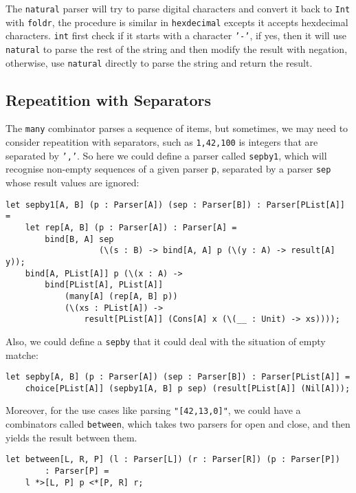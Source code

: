 The \texttt{natural} parser will try to parse digital characters and convert it back to \texttt{Int} with \texttt{foldr}, the procedure is similar in \texttt{hexdecimal} excepts it accepts hexdecimal characters. \texttt{int} first check if it starts with a character \texttt{'-'}, if yes, then it will use \texttt{natural} to parse the rest of the string and then modify the result with negation, otherwise, use \texttt{natural} directly to parse the string and return the result.

\subsection{Repeatition with Separators}

The \texttt{many} combinator parses a sequence of items, but sometimes, we may need to consider repeatition with separators, such as \texttt{1,42,100} is integers that are separated by \texttt{','}. So here we could define a parser called \texttt{sepby1}, which will recognise non-empty sequences of a given parser \texttt{p}, separated by a parser \texttt{sep} whose result values are ignored:

\begin{lstlisting}
let sepby1[A, B] (p : Parser[A]) (sep : Parser[B]) : Parser[PList[A]] =
    let rep[A, B] (p : Parser[A]) : Parser[A] =
        bind[B, A] sep
                   (\(s : B) -> bind[A, A] p (\(y : A) -> result[A] y));
    bind[A, PList[A]] p (\(x : A) ->
        bind[PList[A], PList[A]]
            (many[A] (rep[A, B] p))
            (\(xs : PList[A]) ->
                result[PList[A]] (Cons[A] x (\(__ : Unit) -> xs))));
\end{lstlisting}

Also, we could define a \texttt{sepby} that it could deal with the situation of empty matche:

\begin{lstlisting}
let sepby[A, B] (p : Parser[A]) (sep : Parser[B]) : Parser[PList[A]] =
    choice[PList[A]] (sepby1[A, B] p sep) (result[PList[A]] (Nil[A]));
\end{lstlisting}

Moreover, for the use cases like parsing \texttt{"[42,13,0]"}, we could have a combinators called \texttt{between}, which takes two parsers for open and close, and then yields the result between them.

\begin{lstlisting}
let between[L, R, P] (l : Parser[L]) (r : Parser[R]) (p : Parser[P])
        : Parser[P] =
    l *>[L, P] p <*[P, R] r;
\end{lstlisting}

